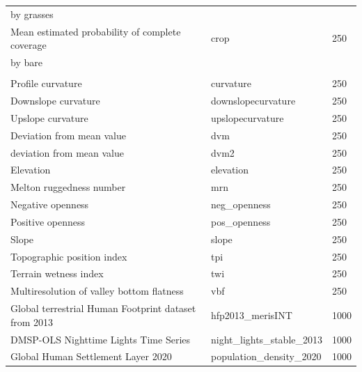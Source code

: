 \documentclass[
  10pt,
  b5paper,
  oneside]{book}
\begin{document}
\begin{table}
\begin{tabular}[t]{lll}
\hspace{1em}by grasses &  & \\
\hspace{1em}Mean estimated probability of complete coverage & crop & 250\\
\hspace{1em}by bare &  & \\
\addlinespace[0.3em]
\multicolumn{3}{l}{\textbf{Terrain}}\\
\hspace{1em}Profile curvature & curvature & 250\\
\hspace{1em}Downslope curvature & downslopecurvature & 250\\
\hspace{1em}Upslope curvature & upslopecurvature & 250\\
\hspace{1em}Deviation from mean value & dvm & 250\\
\hspace{1em}deviation from mean value & dvm2 & 250\\
\hspace{1em}Elevation & elevation & 250\\
\hspace{1em}Melton ruggedness number & mrn & 250\\
\hspace{1em}Negative openness & neg\_openness & 250\\
\hspace{1em}Positive openness & pos\_openness & 250\\
\hspace{1em}Slope & slope & 250\\
\hspace{1em}Topographic position index & tpi & 250\\
\hspace{1em}Terrain wetness index & twi & 250\\
\hspace{1em}Multiresolution of valley bottom flatness & vbf & 250\\
Global terrestrial Human Footprint dataset from 2013 & hfp2013\_merisINT & 1000\\
DMSP-OLS Nighttime Lights Time Series & night\_lights\_stable\_2013 & 1000\\
Global Human Settlement Layer 2020 & population\_density\_2020 & 1000\\
\bottomrule
\end{tabular}
\end{table}
\end{document}
